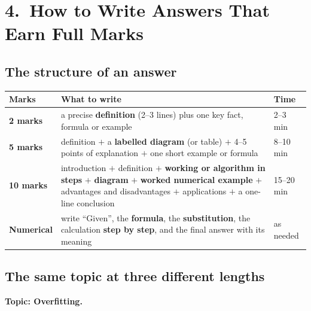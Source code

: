 \section*{4.\ How to Write Answers That Earn Full Marks}

\subsection*{The structure of an answer}

\begin{center}
\small
\begin{tabular}{@{}p{2.3cm}p{9.0cm}p{2.3cm}@{}}
\toprule
\textbf{Marks} & \textbf{What to write} & \textbf{Time}\\
\midrule
\textbf{2 marks} & a precise \textbf{definition} (2--3 lines) plus one key fact, formula or example & 2--3 min\\
\textbf{5 marks} & definition $+$ a \textbf{labelled diagram} (or table) $+$ 4--5 points of explanation $+$ one short example or formula & 8--10 min\\
\textbf{10 marks} & introduction $+$ definition $+$ \textbf{working or algorithm in steps} $+$ \textbf{diagram} $+$ \textbf{worked numerical example} $+$ advantages and disadvantages $+$ applications $+$ a one-line conclusion & 15--20 min\\
\textbf{Numerical} & write ``Given'', the \textbf{formula}, the \textbf{substitution}, the calculation \textbf{step by step}, and the final answer with its meaning & as needed\\
\bottomrule
\end{tabular}
\end{center}

\subsection*{The same topic at three different lengths}

\textbf{Topic: Overfitting.}

